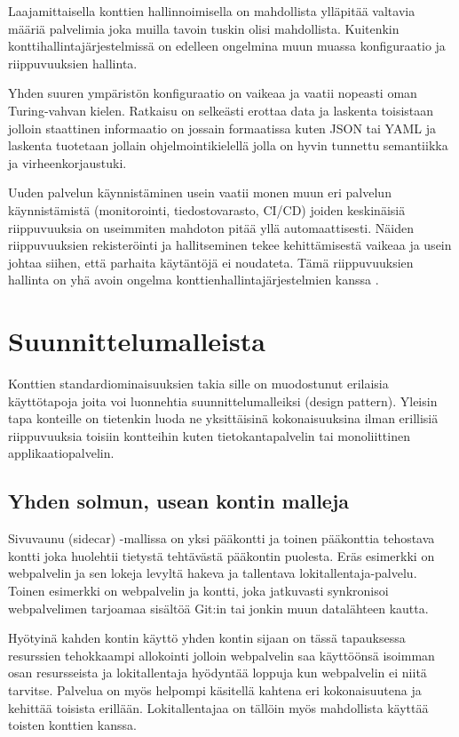 \documentclass[finnish,gradu]{tktltiki3}
\begin{document}
Laajamittaisella konttien hallinnoimisella on mahdollista ylläpitää valtavia määriä palvelimia joka muilla tavoin tuskin olisi mahdollista. Kuitenkin konttihallintajärjestelmissä on edelleen ongelmina muun muassa konfiguraatio ja riippuvuuksien hallinta.

Yhden suuren ympäristön konfiguraatio on vaikeaa ja vaatii nopeasti oman Turing-vahvan kielen. Ratkaisu on selkeästi erottaa data ja laskenta toisistaan jolloin staattinen informaatio on jossain formaatissa kuten JSON tai YAML ja laskenta tuotetaan jollain ohjelmointikielellä jolla on hyvin tunnettu semantiikka ja virheenkorjaustuki.

Uuden palvelun käynnistäminen usein vaatii monen muun eri palvelun käynnistämistä (monitorointi, tiedostovarasto, CI/CD) joiden keskinäisiä riippuvuuksia on useimmiten mahdoton pitää yllä automaattisesti. Näiden riippuvuuksien rekisteröinti ja hallitseminen tekee kehittämisestä vaikeaa ja usein johtaa siihen, että parhaita käytäntöjä ei noudateta. Tämä riippuvuuksien hallinta on yhä avoin ongelma konttienhallintajärjestelmien kanssa \cite{borg-omega-kubernetes}.

\section{Suunnittelumalleista}

Konttien standardiominaisuuksien takia sille on muodostunut erilaisia käyttötapoja joita voi luonnehtia suunnittelumalleiksi (design pattern). Yleisin tapa konteille on tietenkin luoda ne yksittäisinä kokonaisuuksina ilman erillisiä riippuvuuksia toisiin kontteihin kuten tietokantapalvelin tai monoliittinen applikaatiopalvelin.

\subsection{Yhden solmun, usean kontin malleja}

Sivuvaunu (sidecar) -mallissa on yksi pääkontti ja toinen pääkonttia tehostava kontti joka huolehtii tietystä tehtävästä pääkontin puolesta. Eräs esimerkki on webpalvelin ja sen lokeja levyltä hakeva ja tallentava lokitallentaja-palvelu. Toinen esimerkki on webpalvelin ja kontti, joka jatkuvasti synkronisoi webpalvelimen tarjoamaa sisältöä Git:in tai jonkin muun datalähteen kautta.

Hyötyinä kahden kontin käyttö yhden kontin sijaan on tässä tapauksessa resurssien tehokkaampi allokointi jolloin webpalvelin saa käyttöönsä isoimman osan resursseista ja lokitallentaja hyödyntää loppuja kun webpalvelin ei niitä tarvitse. Palvelua on myös helpompi käsitellä kahtena eri kokonaisuutena ja kehittää toisista erillään. Lokitallentajaa on tällöin myös mahdollista käyttää toisten konttien kanssa.
\end{document}
